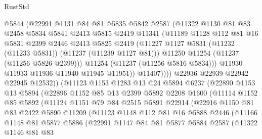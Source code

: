 \begin{lexlean}{RustStd}
\begin{coremodule}
                  @5844
                  (@22991
                    @1131
                    @84
                    @81
                    @5835
                    @5842
                    @2587
                    (@11322
                      @1130
                      @81
                      @83
                      @2458
                      @5834
                      @5841
                      @2413
                      @5815
                      @2419
                      @11341
                      (@11189
                        @1128
                        @112
                        @81
                        @16
                        @5831
                        @2399
                        @2446
                        @2413
                        @5825
                        @2419
                        (@11227 @1127 @5831 (@11232 (@11233 @5831)) (@11237 (@11239 @1127 @81)))
                        @11250
                        @11254
                        (@11237 (@11256 @5826 @2399)))
                      @11254
                      (@11237 (@11256 @5816 @5834)))
                    @11930
                    @11933
                    @11936
                    @11940
                    @11945
                    @11951))
                @11407))))
        @22936
        @22939
        @22942
        @22945
        @12532))
    (@11123
      @1153
      @1283
      @13
      @24
      @5894
      @6237
      (@22890
        @1153
        @13
        @5894
        (@22896
          @1152
          @85
          @13
          @2399
          @5892
          @2208
          @1600
          (@11114
            @1152
            @85
            @5892
            (@11124
              @1151
              @79
              @84
              @2515
              @5891
              @22914
              (@22916
                @1150
                @81
                @83
                @2422
                @5890
                @11209
                (@11123
                  @1148
                  @112
                  @81
                  @16
                  @5888
                  @2446
                  (@11166
                    @1148
                    @81
                    @5877
                    @5886
                    (@22991
                      @1147
                      @84
                      @81
                      @5877
                      @5884
                      @2587
                      (@11322
                        @1146
                        @81
                        @83

\end{coremodule}
\end{lexlean}
